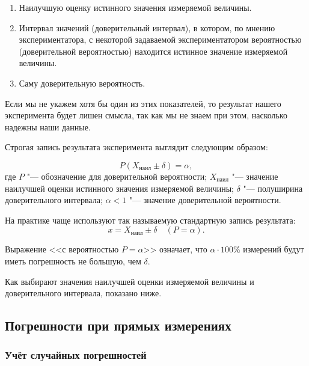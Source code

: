 \documentclass[a4paper, 12pt]{extarticle}
\begin{document}
\begin{enumerate}
  \item Наилучшую оценку истинного значения измеряемой величины.
  \item Интервал значений (доверительный интервал), в котором, по мнению экспериментатора, с некоторой задаваемой экспериментатором вероятностью (доверительной вероятностью) находится истинное значение измеряемой величины.
  \item Саму доверительную вероятность.
\end{enumerate}

Если мы не укажем хотя бы один из этих показателей, то результат нашего эксперимента будет лишен смысла, так как мы не знаем при этом, насколько надежны наши данные.

Строгая запись результата эксперимента выглядит следующим образом:

\begin{equation}
\label{eq:exact-form}
P(X_{\text{наил}} \pm \delta) = \alpha,
\end{equation}
где $P$ "--- обозначение для доверительной вероятности; $X_{\text{наил}}$ "--- значение
наилучшей оценки истинного значения измеряемой величины; $\delta$ "--- полуширина доверительного интервала; $\alpha < 1$ "--- значение доверительной вероятности.

На практике чаще используют так называемую стандартную
запись результата:
\begin{equation}
\label{eq:practical-form}
x = X_{\text{наил}} \pm \delta \quad \left(P = \alpha\right).
\end{equation}

Выражение <<с вероятностью $P = \alpha$>> означает, что $\alpha \cdot 100\%$ измерений будут иметь погрешность не большую, чем $\delta$.

Как выбирают значения наилучшей оценки измеряемой величины и доверительного интервала, показано ниже.


\subsection{Погрешности при прямых измерениях}
\subsubsection{Учёт случайных погрешностей}
\end{document}
